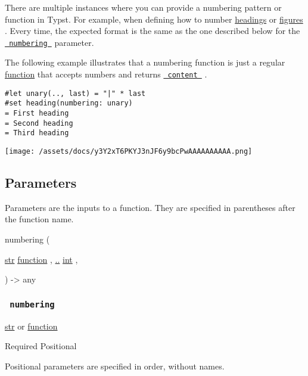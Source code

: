 There are multiple instances where you can provide a numbering pattern
or function in Typst. For example, when defining how to number
\href{/docs/reference/model/heading/}{headings} or
\href{/docs/reference/model/figure/}{figures} . Every time, the expected
format is the same as the one described below for the
\href{/docs/reference/model/numbering/\#parameters-numbering}{\texttt{\ numbering\ }}
parameter.

The following example illustrates that a numbering function is just a
regular \href{/docs/reference/foundations/function/}{function} that
accepts numbers and returns
\href{/docs/reference/foundations/content/}{\texttt{\ content\ }} .

\begin{verbatim}
#let unary(.., last) = "|" * last
#set heading(numbering: unary)
= First heading
= Second heading
= Third heading
\end{verbatim}

\texttt{[image: /assets/docs/y3Y2xT6PKYJ3nJF6y9bcPwAAAAAAAAAA.png]}

\subsection{\texorpdfstring{{ Parameters
}}{ Parameters }}\label{parameters}

\label{parameters-tooltip}
Parameters are the inputs to a function. They are specified in
parentheses after the function name.

{ numbering } (

{ \href{/docs/reference/foundations/str/}{str}
\href{/docs/reference/foundations/function/}{function} , } {
\hyperref[parameters-numbers]{..}
\href{/docs/reference/foundations/int/}{int} , }

) -\textgreater{} { any }

\subsubsection{\texorpdfstring{\texttt{\ numbering\ }}{ numbering }}\label{parameters-numbering}

\href{/docs/reference/foundations/str/}{str} {or}
\href{/docs/reference/foundations/function/}{function}

{Required} {{ Positional }}

\label{parameters-numbering-positional-tooltip}
Positional parameters are specified in order, without names.


